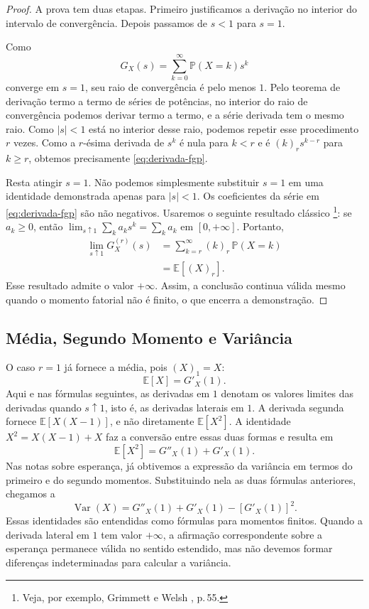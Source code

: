 \documentclass[12pt,portuguese]{article}
\theoremstyle{definition}
\theoremstyle{plainexercise}
\theoremstyle{starredexercise}
\theoremstyle{definition}
\begin{document}
\begin{proof}
A prova tem duas etapas. Primeiro justificamos a derivação no interior do
intervalo de convergência. Depois passamos de $s<1$ para $s=1$.

Como
\[
G_X(s)=\sum_{k=0}^{\infty}\mathbb{P}(X=k)s^k
\]
converge em $s=1$, seu raio de convergência é pelo menos $1$. Pelo teorema de
derivação termo a termo de séries de potências, no interior do raio de
convergência podemos derivar termo a termo, e a série derivada tem o mesmo
raio. Como $|s|<1$ está no interior desse raio, podemos repetir esse
procedimento $r$ vezes. Como a $r$-ésima
derivada de $s^k$ é nula para $k<r$ e é $(k)_r s^{k-r}$ para $k\geqslant r$,
obtemos precisamente \eqref{eq:derivada-fgp}.

Resta atingir $s=1$. Não podemos simplesmente substituir $s=1$ em uma
identidade demonstrada apenas para $|s|<1$. Os coeficientes da série em
\eqref{eq:derivada-fgp} são não negativos. Usaremos o seguinte resultado
clássico%
\footnote{Veja, por exemplo, Grimmett e Welsh \cite{GrimmettWelsh2014}, p.\,55.}:
se $a_k\geqslant0$, então
$\lim_{s\uparrow1}\sum_k a_ks^k=\sum_k a_k$ em $[0,+\infty]$. Portanto,
\begin{align*}
\lim_{s\uparrow 1}G_X^{(r)}(s)
&=\sum_{k=r}^{\infty}(k)_r\,\mathbb{P}(X=k)
\\[0.3cm]
&=\mathbb{E}[(X)_r].
\end{align*}
Esse resultado admite o valor $+\infty$. Assim, a conclusão continua válida mesmo
quando o momento fatorial não é finito, o que encerra a demonstração.
\end{proof}

\subsection{Média, Segundo Momento e Variância}
\label{sec:media-variancia-fgp}

O caso $r=1$ já fornece a média, pois $(X)_1=X$:
\begin{equation}\label{eq:media-por-fgp}
\mathbb{E}[X]=G'_X(1).
\end{equation}
Aqui e nas fórmulas seguintes, as derivadas em $1$ denotam os valores limites
das derivadas quando $s\uparrow1$, isto é, as derivadas laterais em $1$.
A derivada segunda fornece $\mathbb{E}[X(X-1)]$, e não diretamente
$\mathbb{E}[X^2]$. A identidade $X^2=X(X-1)+X$ faz a conversão entre essas
duas formas e resulta em
\[
\mathbb{E}[X^2]=G''_X(1)+G'_X(1).
\]
Nas notas sobre esperança, já obtivemos a expressão da variância em termos do
primeiro e do segundo momentos. Substituindo nela as duas fórmulas anteriores,
chegamos a
\begin{equation}\label{eq:variancia-por-fgp}
\operatorname{Var}(X)
=G''_X(1)+G'_X(1)-[G'_X(1)]^2.
\end{equation}
Essas identidades são entendidas como fórmulas para momentos finitos. Quando a
derivada lateral em $1$ tem valor $+\infty$, a afirmação correspondente sobre a
esperança permanece válida no sentido estendido, mas não devemos formar
diferenças indeterminadas para calcular a variância.
\end{document}
